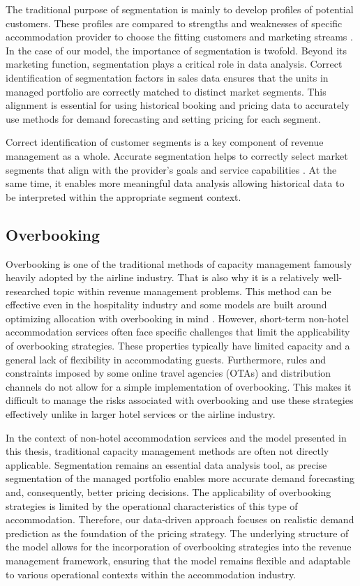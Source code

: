 The traditional purpose of segmentation is mainly to develop profiles of potential customers. These profiles are compared to strengths and weaknesses of specific accommodation provider to choose the fitting customers and marketing streams \cite{Ivanov2014}. In the case of our model, the importance of segmentation is twofold. Beyond its marketing function, segmentation plays a critical role in data analysis. Correct identification of segmentation factors in sales data ensures that the units in managed portfolio are correctly matched to distinct market segments. This alignment is essential for using historical booking and pricing data to accurately use methods for demand forecasting and setting pricing for each segment.

Correct identification of customer segments is a key component of revenue management as a whole. Accurate segmentation helps to correctly select market segments that align with the provider's goals and service capabilities \cite{Petricek2021}. At the same time, it enables more meaningful data analysis allowing historical data to be interpreted within the appropriate segment context.

\subsection{Overbooking}
Overbooking is one of the traditional methods of capacity management famously heavily adopted by the airline industry. That is also why it is a relatively well-researched topic within revenue management problems. This method can be effective even in the hospitality industry and some models are built around optimizing allocation with overbooking in mind \cite{Pimentel2019}. However, short-term non-hotel accommodation services often face specific challenges that limit the applicability of overbooking strategies. These properties typically have limited capacity and a general lack of flexibility in accommodating guests. Furthermore, rules and constraints imposed by some online travel agencies (OTAs) and distribution channels do not allow for a simple implementation of overbooking. This makes it difficult to manage the risks associated with overbooking and use these strategies effectively unlike in larger hotel services \cite{Schwartz2025} or the airline industry.

\medskip
In the context of non-hotel accommodation services and the model presented in this thesis, traditional capacity management methods are often not directly applicable. Segmentation remains an essential data analysis tool, as precise segmentation of the managed portfolio enables more accurate demand forecasting and, consequently, better pricing decisions. The applicability of overbooking strategies is limited by the operational characteristics of this type of accommodation. Therefore, our data-driven approach focuses on realistic demand prediction as the foundation of the pricing strategy. The underlying structure of the model allows for the incorporation of overbooking strategies into the revenue management framework, ensuring that the model remains flexible and adaptable to various operational contexts within the accommodation industry.

